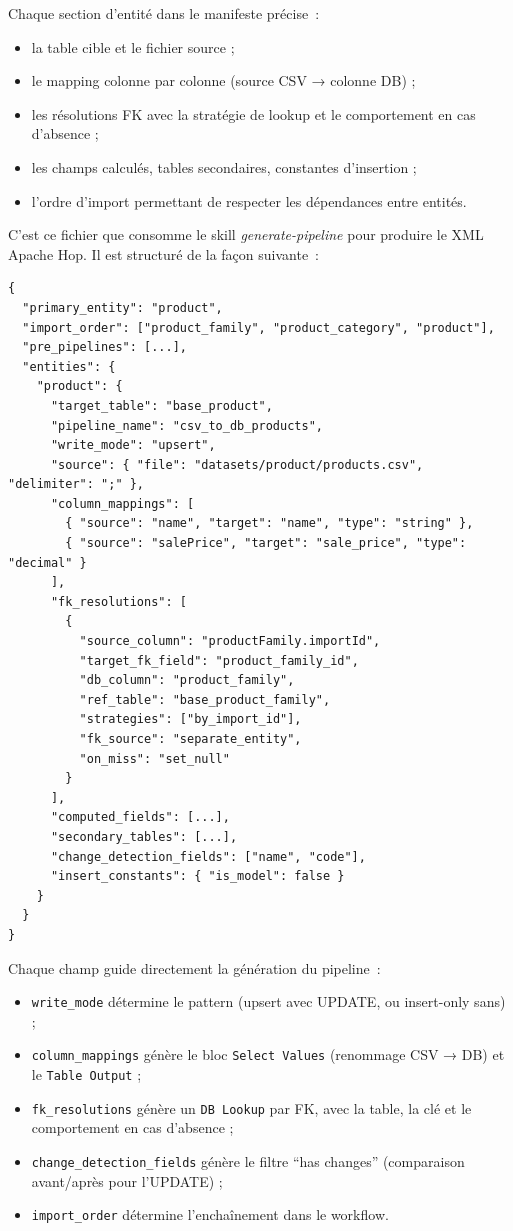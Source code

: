 Chaque section d'entité dans le manifeste précise~:
\begin{itemize}
    \item la table cible et le fichier source ;
    \item le mapping colonne par colonne (source CSV → colonne DB) ;
    \item les résolutions FK avec la stratégie de lookup et le comportement en cas d'absence ;
    \item les champs calculés, tables secondaires, constantes d'insertion ;
    \item l'ordre d'import permettant de respecter les dépendances entre entités.
\end{itemize}

C'est ce fichier que consomme le skill \textit{generate-pipeline} pour produire le XML Apache Hop. Il est structuré de la façon suivante~:

\begin{verbatim}
{
  "primary_entity": "product",
  "import_order": ["product_family", "product_category", "product"],
  "pre_pipelines": [...],
  "entities": {
    "product": {
      "target_table": "base_product",
      "pipeline_name": "csv_to_db_products",
      "write_mode": "upsert",
      "source": { "file": "datasets/product/products.csv", "delimiter": ";" },
      "column_mappings": [
        { "source": "name", "target": "name", "type": "string" },
        { "source": "salePrice", "target": "sale_price", "type": "decimal" }
      ],
      "fk_resolutions": [
        {
          "source_column": "productFamily.importId",
          "target_fk_field": "product_family_id",
          "db_column": "product_family",
          "ref_table": "base_product_family",
          "strategies": ["by_import_id"],
          "fk_source": "separate_entity",
          "on_miss": "set_null"
        }
      ],
      "computed_fields": [...],
      "secondary_tables": [...],
      "change_detection_fields": ["name", "code"],
      "insert_constants": { "is_model": false }
    }
  }
}
\end{verbatim}

Chaque champ guide directement la génération du pipeline~:
\begin{itemize}
    \item \texttt{write\_mode} détermine le pattern (upsert avec UPDATE, ou insert-only sans) ;
    \item \texttt{column\_mappings} génère le bloc \texttt{Select Values} (renommage CSV → DB) et le \texttt{Table Output} ;
    \item \texttt{fk\_resolutions} génère un \texttt{DB Lookup} par FK, avec la table, la clé et le comportement en cas d'absence ;
    \item \texttt{change\_detection\_fields} génère le filtre ``has changes'' (comparaison avant/après pour l'UPDATE) ;
    \item \texttt{import\_order} détermine l'enchaînement dans le workflow.
\end{itemize}


